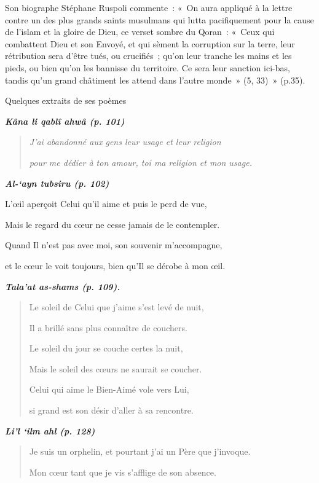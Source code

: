Son biographe Stéphane Ruspoli commente~: «~On aura appliqué à la lettre
contre un des plus grands saints musulmans qui lutta pacifiquement pour
la cause de l'islam et la gloire de Dieu, ce verset sombre du Qoran~:
«~Ceux qui combattent Dieu et son Envoyé, et qui sèment la corruption
sur la terre, leur rétribution sera d'être tués, ou crucifiés~; qu'on
leur tranche les mains et les pieds, ou bien qu'on les bannisse du
territoire. Ce sera leur sanction ici-bas, tandis qu'un grand châtiment
les attend dans l'autre monde~» (5, 33)~» (p.35).

Quelques extraits de ses poèmes

\emph{\textbf{Kâna li qablî ahwâ (p. 101)}}

\begin{quote}
\emph{J'ai abandonné aux gens leur usage et leur religion}

\emph{pour me dédier à ton amour, toi ma religion et mon usage.}
\end{quote}

\emph{\textbf{Al-`ayn tubsiru (p. 102)}}

L'œil aperçoit Celui qu'il aime et puis le perd de vue,

Mais le regard du cœur ne cesse jamais de le contempler.

Quand Il n'est pas avec moi, son souvenir m'accompagne,

et le cœur le voit toujours, bien qu'Il se dérobe à mon œil.

\emph{\textbf{Tala'at as-shams (p. 109).}}

\begin{quote}
Le soleil de Celui que j'aime s'est levé de nuit,

Il a brillé sans plus connaître de couchers.

Le soleil du jour se couche certes la nuit,

Mais le soleil des cœurs ne saurait se coucher.

Celui qui aime le Bien-Aimé vole vers Lui,

si grand est son désir d'aller à sa rencontre.
\end{quote}

\emph{\textbf{Li'l `ilm ahl (p. 128)}}

\begin{quote}
Je suis un orphelin, et pourtant j'ai un Père que j'invoque.

Mon cœur tant que je vis s'afflige de son absence.
\end{quote}

